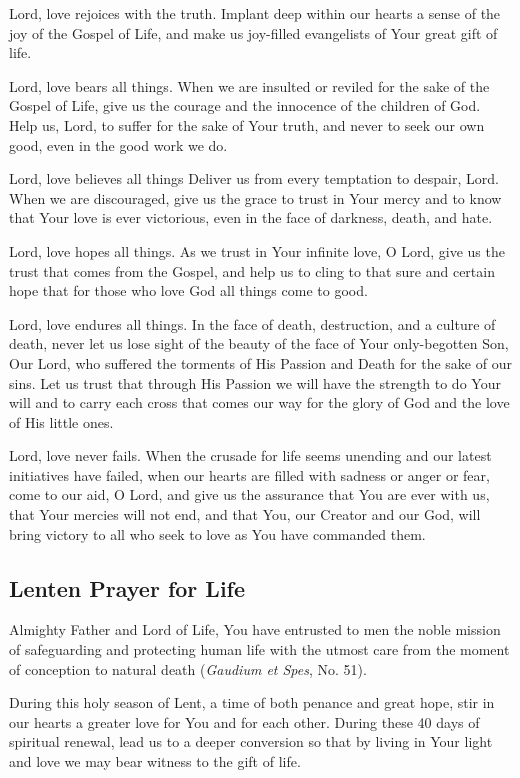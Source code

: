 \documentclass[12pt]{article}
\newcommand{\prayertitle}[1]{\subsection{#1}}
\begin{document}
Lord, love rejoices with the truth.
Implant deep within our hearts a sense of the joy of the Gospel of Life, and make us joy-filled evangelists of Your great gift of life.

Lord, love bears all things.
When we are insulted or reviled for the sake of the Gospel of Life, give us the courage and the innocence of the children of God.
Help us, Lord, to suffer for the sake of Your truth, and never to seek our own good, even in the good work we do.

Lord, love believes all things
Deliver us from every temptation to despair, Lord. When we are discouraged, give us the grace to trust in Your mercy and to know that Your love is ever victorious, even in the face of darkness, death, and hate.

Lord, love hopes all things.
As we trust in Your infinite love, O Lord, give us the trust that comes from the Gospel, and help us to cling to that sure and certain hope that for those who love God all things come to good.

Lord, love endures all things.
In the face of death, destruction, and a culture of death, never let us lose sight of the beauty of the face of Your only-begotten Son, Our Lord, who suffered the torments of His Passion and Death for the sake of our sins.
Let us trust that through His Passion we will have the strength to do Your will and to carry each cross that comes our way for the glory of God and the love of His little ones.

Lord, love never fails.
When the crusade for life seems unending and our latest initiatives have failed, when our hearts are filled with sadness or anger or fear, come to our aid, O Lord, and give us the assurance that You are ever with us, that Your mercies will not end, and that You, our Creator and our God, will bring victory to all who seek to love as You have commanded them.

\prayertitle{Lenten Prayer for Life}
Almighty Father and Lord of Life,
You have entrusted to men the noble mission of safeguarding and protecting human life with the utmost care from the moment of conception to natural death (\textit{Gaudium et Spes}, No. 51).

During this holy season of Lent, a time of both penance and great hope, stir in our hearts a greater love for You and for each other.
During these 40 days of spiritual renewal, lead us to a deeper conversion so that by living in Your light and love we may bear witness to the gift of life.
\end{document}
